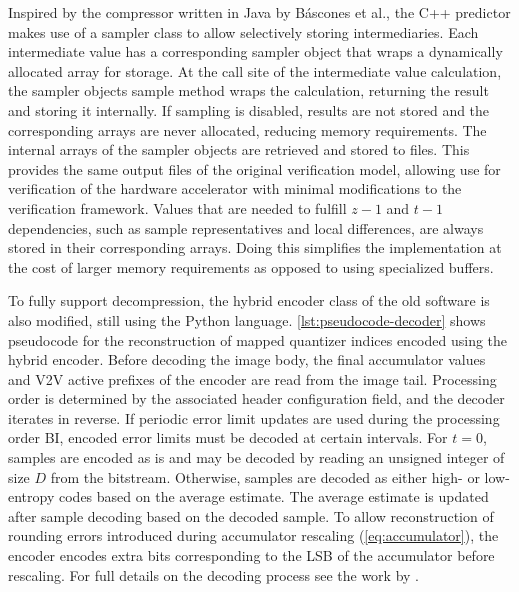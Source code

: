 Inspired by the compressor written in Java by Báscones et al., the C++ predictor makes use of a sampler class to allow selectively storing intermediaries. Each intermediate value has a corresponding sampler object that wraps a dynamically allocated array for storage. At the call site of the intermediate value calculation, the sampler objects sample method wraps the calculation, returning the result and storing it internally. If sampling is disabled, results are not stored and the corresponding arrays are never allocated, reducing memory requirements. The internal arrays of the sampler objects are retrieved and stored to files. This provides the same output files of the original verification model, allowing use for verification of the hardware accelerator with minimal modifications to the verification framework. Values that are needed to fulfill $z-1$ and $t-1$ dependencies, such as sample representatives and local differences, are always stored in their corresponding arrays. Doing this simplifies the implementation at the cost of larger memory requirements as opposed to using specialized buffers.

To fully support decompression, the hybrid encoder class of the old software is also modified, still using the Python language. \autoref{lst:pseudocode-decoder} shows pseudocode for the reconstruction of mapped quantizer indices encoded using the hybrid encoder. Before decoding the image body, the final accumulator values and \acrshort{V2V} active prefixes of the encoder are read from the image tail. Processing order is determined by the associated header configuration field, and the decoder iterates in reverse. If periodic error limit updates are used during the processing order \acrshort{BI}, encoded error limits must be decoded at certain intervals. For $t=0$, samples are encoded as is and may be decoded by reading an unsigned integer of size $D$ from the bitstream. Otherwise, samples are decoded as either high- or low-entropy codes based on the average estimate. The average estimate is updated after sample decoding based on the decoded sample. To allow reconstruction of rounding errors introduced during accumulator rescaling (\autoref{eq:accumulator}), the encoder encodes extra bits corresponding to the \acrshort{LSB} of the accumulator before rescaling. For full details on the decoding process see the work by \citeauthor{blanesHYBRIDENTROPYENCODER} \cite{blanesHYBRIDENTROPYENCODER}.


